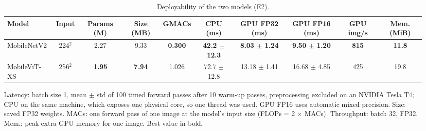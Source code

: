 \begin{table}[!t]
\centering
\footnotesize
\setlength{\tabcolsep}{4pt}
\caption{Deployability of the two models (E2).}
\label{tab:deploy}
\begin{tabular}{lccccccccc}
\toprule
Model & Input & Params (M) & Size (MB) & GMACs & CPU (ms) & GPU FP32 (ms) & GPU FP16 (ms) & GPU img/s & Mem. (MiB) \\
\midrule
MobileNetV2 & 224$^2$ & 2.27 & 9.33 & \textbf{0.300} & \textbf{42.2 $\pm$ 12.3} & \textbf{8.03 $\pm$ 1.24} & \textbf{9.50 $\pm$ 1.20} & \textbf{815} & \textbf{11.8} \\
MobileViT-XS & 256$^2$ & \textbf{1.95} & \textbf{7.94} & 1.026 & 72.7 $\pm$ 12.8 & 13.18 $\pm$ 1.41 & 16.68 $\pm$ 4.85 & 425 & 19.8 \\
\bottomrule
\end{tabular}
\par\smallskip\parbox{\linewidth}{\scriptsize Latency: batch size 1, mean $\pm$ std of 100 timed forward passes after 10 warm-up passes, preprocessing excluded on an NVIDIA Tesla T4; CPU on the same machine, which exposes one physical core, so one thread was used. GPU FP16 uses automatic mixed precision. Size: saved FP32 weights. MACs: one forward pass of one image at the model's input size (FLOPs = 2 $\times$ MACs). Throughput: batch 32, FP32. Mem.: peak extra GPU memory for one image. Best value in bold.}
\end{table}
